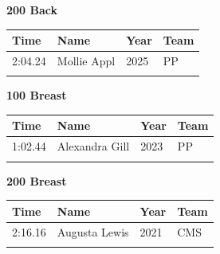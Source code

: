 \vspace{1.2em}
\noindent\begin{minipage}[t]{0.98\textwidth}
\centering
\textbf{\textcolor{teamprimary}{200 Back}}\par
\vspace{0.5em}
\centering
\small
\renewcommand{\arraystretch}{1.0}
\setlength{\tabcolsep}{4pt}
\begin{tabular}{@{}p{2.5cm}p{4.5cm}p{1.5cm}p{2.5cm}@{}}
\toprule
\textbf{Time} & \textbf{Name} & \textbf{Year} & \textbf{Team} \\
\midrule
2:04.24 & Mollie Appl & 2025 & PP \\
\bottomrule
\vspace{0.5em}
\end{tabular}
\end{minipage}
\vspace{1.2em}
\noindent\begin{minipage}[t]{0.98\textwidth}
\centering
\textbf{\textcolor{teamprimary}{100 Breast}}\par
\vspace{0.5em}
\centering
\small
\renewcommand{\arraystretch}{1.0}
\setlength{\tabcolsep}{4pt}
\begin{tabular}{@{}p{2.5cm}p{4.5cm}p{1.5cm}p{2.5cm}@{}}
\toprule
\textbf{Time} & \textbf{Name} & \textbf{Year} & \textbf{Team} \\
\midrule
1:02.44 & Alexandra Gill & 2023 & PP \\
\bottomrule
\vspace{0.5em}
\end{tabular}
\end{minipage}
\vspace{1.2em}
\noindent\begin{minipage}[t]{0.98\textwidth}
\centering
\textbf{\textcolor{teamprimary}{200 Breast}}\par
\vspace{0.5em}
\centering
\small
\renewcommand{\arraystretch}{1.0}
\setlength{\tabcolsep}{4pt}
\begin{tabular}{@{}p{2.5cm}p{4.5cm}p{1.5cm}p{2.5cm}@{}}
\toprule
\textbf{Time} & \textbf{Name} & \textbf{Year} & \textbf{Team} \\
\midrule
2:16.16 & Augusta Lewis & 2021 & CMS \\
\bottomrule
\vspace{0.5em}
\end{tabular}
\end{minipage}
\vspace{1.2em}
